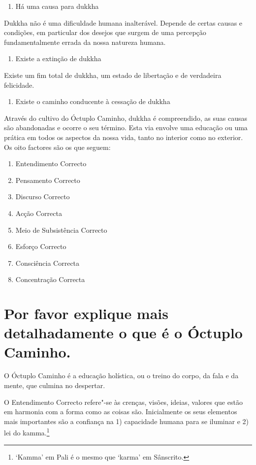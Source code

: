 \begin{enumerate}[resume,topsep=0pt]
\item Há uma causa para dukkha
\end{enumerate}

Dukkha não é uma dificuldade humana inalterável. Depende de certas
causas e condições, em particular dos desejos que surgem de uma
percepção fundamentalmente errada da nossa natureza humana.

\begin{enumerate}[resume,topsep=0pt]
\item Existe a extinção de dukkha
\end{enumerate}

Existe um fim total de dukkha, um estado de libertação e de verdadeira
felicidade.

\begin{enumerate}[resume,topsep=0pt]
\item Existe o caminho conducente à cessação de dukkha
\end{enumerate}

Através do cultivo do Óctuplo Caminho, dukkha é compreendido, as suas
causas são abandonadas e ocorre o seu término. Esta via envolve uma
educação ou uma prática em todos os aspectos da nossa vida, tanto no
interior como no exterior. Os oito factores são os que seguem:

\begin{enumerate}
\item Entendimento Correcto
\item Pensamento Correcto
\item Discurso Correcto
\item Acção Correcta
\item Meio de Subsistência Correcto
\item Esforço Correcto
\item Consciência Correcta
\item Concentração Correcta
\end{enumerate}

\section{Por favor explique mais detalhadamente o que é o Óctuplo Caminho.}

O Óctuplo Caminho é a educação holística, ou o treino do corpo, da fala
e da mente, que culmina no despertar.

O Entendimento Correcto refere"-se às crenças, visões, ideias, valores
que estão em harmonia com a forma como as coisas são. Inicialmente os
seus elementos mais importantes são a confiança na 1) capacidade humana
para se iluminar e 2) lei do kamma.\footnote{`Kamma' em Pali é o mesmo que `karma' em Sânscrito.}

